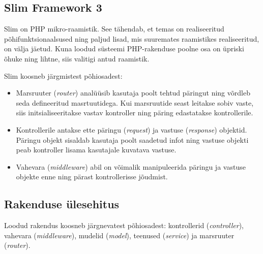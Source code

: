 \documentclass[a4paper,12pt]{article} %
\begin{document}
\subsection{Slim Framework 3}
Slim on PHP mikro-raamistik. See tähendab, et temas on realiseeritud põhifunktsionaalsused ning paljud lisad, mis suuremates raamistikes realiseeritud, on välja jäetud. Kuna loodud süsteemi PHP-rakenduse poolne osa on üpriski õhuke ning lihtne, siis valitigi antud raamistik.\par
Slim koosneb järgmistest põhiosadest:
\begin{itemize}
\item Marsruuter (\textit{router}) analüüsib kasutaja poolt tehtud päringut ning võrdleb seda defineeritud masrtuutidega. Kui marsruutide seast leitakse sobiv vaste, siis initsialiseeritakse vastav kontroller ning päring edastatakse kontrollerile.
\item Kontrollerile antakse ette päringu (\textit{request}) ja vastuse (\textit{response}) objektid. Päringu objekt sisaldab kasutaja poolt saadetud infot ning vastuse objekti peab kontroller lisama kasutajale kuvatava vastuse.
\item Vahevara (\textit{middleware}) abil on võimalik manipuleerida päringu ja vastuse objekte enne ning pärast kontrollerisse jõudmist.
\end{itemize}
\cite{SlimFW}
\subsection{Rakenduse ülesehitus}
Loodud rakendus koosneb järgnevatest põhiosadest: kontrollerid (\textit{controller}), vahevara (\textit{middleware}), mudelid (\textit{model}), teenused (\textit{service}) ja marsruuter (\textit{router}).
\end{document}
